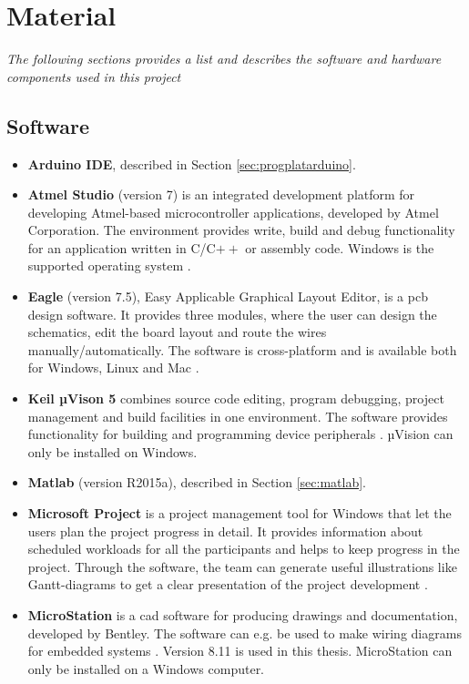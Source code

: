 \chapter{Material}
\textit{The following sections provides a list and describes the software and hardware components used in this project}
\section{Software}
\label{sec:software}
\begin{itemize}
    \item \textbf{Arduino IDE}, described in Section \ref{sec:progplatarduino}.
    \item \textbf{Atmel Studio} (version 7) is an integrated development platform for developing Atmel-based microcontroller applications, developed by Atmel Corporation. The environment provides write, build and debug functionality for an application written in C/C$++$ or assembly code. Windows is the supported operating system \cite{atmel}. 
    \item \textbf{Eagle} (version 7.5), Easy Applicable Graphical Layout Editor, is a \acrfull{pcb} design software. It provides three modules, where the user can design the schematics, edit the board layout and route the wires manually/automatically. The software is cross-platform and is available both for Windows, Linux and Mac \cite{eagle}.
    \item \textbf{Keil µVison 5} combines source code editing, program debugging, project management and build facilities in one environment. The software provides functionality for building and programming device peripherals \cite{uvision}. µVision can only be installed on Windows.
    \item \textbf{Matlab} (version R2015a), described in Section \ref{sec:matlab}.
    \item \textbf{Microsoft Project} is a project management tool for Windows that let the users plan the project progress in detail. It provides information about scheduled workloads for all the participants and helps to keep progress in the project. Through the software, the team can generate useful illustrations like Gantt-diagrams to get a clear presentation of the project development \cite{msproject}. 
    \item \textbf{MicroStation} is a \acrfull{cad} software for producing drawings and documentation, developed by Bentley. The software can e.g. be used to make wiring diagrams for embedded systems \cite{microstation}. Version 8.11 is used in this thesis. MicroStation can only be installed on a Windows computer.

\end{itemize}
